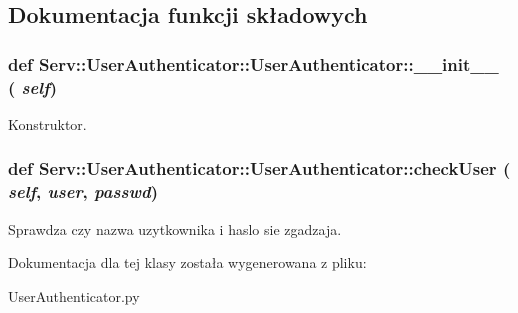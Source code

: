 \subsection{Dokumentacja funkcji składowych}
\hypertarget{class_serv_1_1_user_authenticator_1_1_user_authenticator_a8da26a197368b560fc5b51a56cf95ccf}{
\subsubsection[{\_\-\_\-init\_\-\_\-}]{\setlength{\rightskip}{0pt plus 5cm}def Serv::UserAuthenticator::UserAuthenticator::\_\-\_\-init\_\-\_\- ( {\em self})}}
\label{class_serv_1_1_user_authenticator_1_1_user_authenticator_a8da26a197368b560fc5b51a56cf95ccf}
\begin{DoxyVerb}Konstruktor.\end{DoxyVerb}
 \hypertarget{class_serv_1_1_user_authenticator_1_1_user_authenticator_adf35019818eb86047a9c8d1d415bf3e5}{
\subsubsection[{checkUser}]{\setlength{\rightskip}{0pt plus 5cm}def Serv::UserAuthenticator::UserAuthenticator::checkUser ( {\em self}, \/   {\em user}, \/   {\em passwd})}}
\label{class_serv_1_1_user_authenticator_1_1_user_authenticator_adf35019818eb86047a9c8d1d415bf3e5}
\begin{DoxyVerb}Sprawdza czy nazwa uzytkownika i haslo sie zgadzaja.\end{DoxyVerb}
 

Dokumentacja dla tej klasy została wygenerowana z pliku:\begin{DoxyCompactItemize}
\item 
UserAuthenticator.py\end{DoxyCompactItemize}

